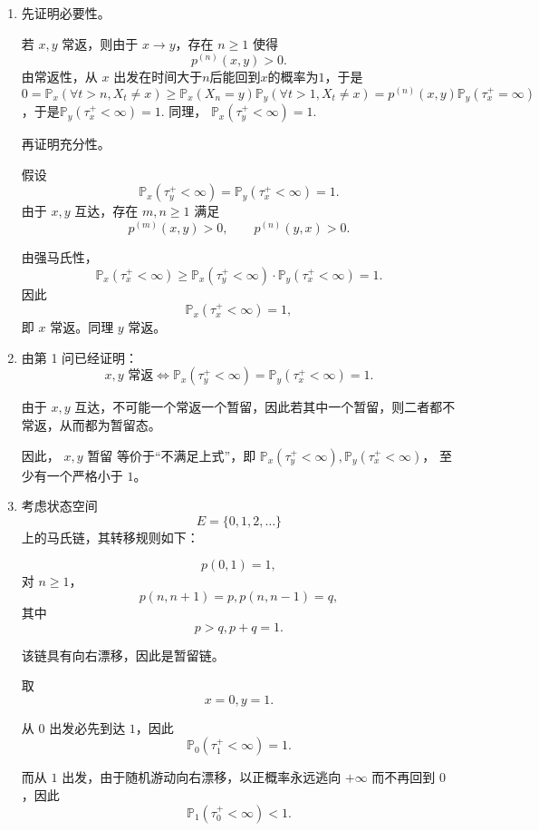 \documentclass{ctexart}
\begin{document}
\begin{solution}
  \begin{enumerate}

    \item
      先证明必要性。

      若 \(x,y\) 常返，则由于 \(x\to y\)，存在 \(n\ge1\) 使得
      \[
        p^{(n)}(x,y)>0.
      \]
      由常返性，从 \(x\) 出发在时间大于\(n \)后能回到\(x \)的概率为\(1 \)，于是
      \[
        0=\mathbb{P}_x(\forall t > n,X_t \neq x) \geq \mathbb{\mathbb{P}}_x(X_n=y)\mathbb{\mathbb{P}}_y(\forall t >1,X_t \neq x) = p^{(n)}(x,y)\mathbb{\mathbb{P}}_y(\tau_x^+ = \infty)
      \]
      ，于是\( \mathbb{P}_y(\tau_x^+<\infty)=1. \) 同理， \(\mathbb{P}_x(\tau_y^+<\infty)=1.\)

      再证明充分性。

      假设
      \[
        \mathbb{P}_x(\tau_y^+<\infty)=\mathbb{P}_y(\tau_x^+<\infty)=1.
      \]
      由于 \(x,y\) 互达，存在 \(m,n\ge1\) 满足
      \[
        p^{(m)}(x,y)>0,\qquad p^{(n)}(y,x)>0.
      \]

      由强马氏性，
      \[
        \mathbb{P}_x(\tau_x^+<\infty)
        \ge
        \mathbb{P}_x(\tau_y^+<\infty)\cdot \mathbb{P}_y(\tau_x^+<\infty)
        =1.
      \]
      因此
      \[
        \mathbb{P}_x(\tau_x^+<\infty)=1,
      \]
      即 \(x\) 常返。同理 \(y\) 常返。

    \item
      由第 1 问已经证明：
      \[
        x,y \text{ 常返}
        \iff
        \mathbb{P}_x(\tau_y^+<\infty)=\mathbb{P}_y(\tau_x^+<\infty)=1.
      \]

      由于 \(x,y\) 互达，不可能一个常返一个暂留，因此若其中一个暂留，则二者都不常返，从而都为暂留态。

      因此，
      \(x,y\) 暂留
      等价于“不满足上式”，即 \(\mathbb{P}_x(\tau_y^+<\infty), \mathbb{P}_y(\tau_x^+<\infty)\)，
      至少有一个严格小于 \(1\)。

    \item
      考虑状态空间
      \[
        E=\{0,1,2,\dots\}
      \]
      上的马氏链，其转移规则如下：

      \[
        p(0,1)=1,
      \]
      对 \(n\ge1\)，
      \[
        p(n,n+1)=p,
        p(n,n-1)=q,
      \]
      其中
      \[
        p>q, p+q=1.
      \]

      该链具有向右漂移，因此是暂留链。

      取
      \[
        x=0,y=1.
      \]

      从 \(0\) 出发必先到达 \(1\)，因此
      \[
        \mathbb{P}_0(\tau_1^+<\infty)=1.
      \]

      而从 \(1\) 出发，由于随机游动向右漂移，以正概率永远逃向 \(+\infty\) 而不再回到 \(0\)，因此
      \[
        \mathbb{P}_1(\tau_0^+<\infty)<1.
      \]
  \end{enumerate}
\end{solution}
\end{document}

